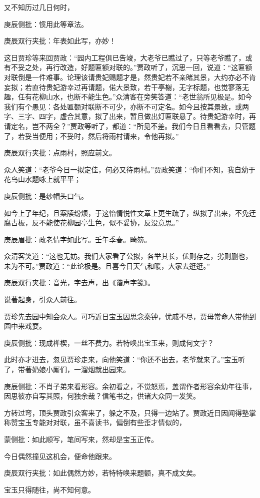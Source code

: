 \begin{parag}


    又不知历过几日何时，\begin{note}庚辰侧批：惯用此等章法。\end{note}\begin{note}庚辰双行夹批：年表如此写，亦妙！\end{note}这日贾珍等来回贾政：“园内工程俱已告竣，大老爷已瞧过了，只等老爷瞧了，或有不妥之处，再行改造，好题匾额对联的。”贾政听了，沉思一回，说道：“这匾额对联倒是一件难事。论理该请贵妃赐题才是，然贵妃若不亲睹其景，大约亦必不肯妄拟；若直待贵妃游幸过再请题，偌大景致，若干亭榭，无字标题，也觉寥落无趣，任有花柳山水，也断不能生色。”众清客在旁笑答道：“老世翁所见极是。如今我们有个愚见：各处匾额对联断不可少，亦断不可定名。如今且按其景致，或两字、三字、四字，虚合其意，拟了出来，暂且做出灯匾联悬了。待贵妃游幸时，再请定名，岂不两全？”贾政等听了，都道：“所见不差。我们今日且看看去，只管题了，若妥当便用；不妥时，然后将雨村请来，令他再拟。”\begin{note}庚辰双行夹批：点雨村，照应前文。\end{note}众人笑道：“老爷今日一拟定佳，何必又待雨村。”贾政笑道：“你们不知，我自幼于花鸟山水题咏上就平平；\begin{note}庚辰侧批：是纱帽头口气。\end{note}如今上了年纪，且案牍纷烦，于这怡情悦性文章上更生疏了，纵拟了出来，不免迂腐古板，反不能使花柳园亭生色，似不妥协，反没意思。”\begin{note}庚辰眉批：政老情字如此写。壬午季春。畸笏。\end{note}众清客笑道：“这也无妨。我们大家看了公拟，各举其长，优则存之，劣则删也，未为不可。”贾政道：“此论极是。且喜今日天气和暖，大家去逛逛。”\begin{note}庚辰双行夹批：音光，字去声，出《谐声字笺》。\end{note}说著起身，引众人前往。
\end{parag}


\begin{parag}


    贾珍先去园中知会众人。可巧近日宝玉因思念秦钟，忧戚不尽，贾母常命人带他到园中来戏耍。\begin{note}庚辰侧批：现成榫楔，一丝不费力。若特唤出宝玉来，则成何文字？\end{note}此时亦才进去，忽见贾珍走来，向他笑道：“你还不出去，老爷就来了。”宝玉听了，带著奶娘小厮们，一溜烟就出园来。\begin{note}庚辰侧批：不肖子弟来看形容。余初看之，不觉怒焉，盖谓作者形容余幼年往事，因思彼亦自写其照，何独余哉？信笔书之，供诸大众同一发笑。\end{note}方转过弯，顶头贾政引众客来了，躲之不及，只得一边站了。贾政近日因闻得塾掌称赞宝玉专能对对联，虽不喜读书，偏倒有些歪才情似的，\begin{note}蒙侧批：如此顺写，笔间写来，然却是宝玉正传。\end{note}今日偶然撞见这机会，便命他跟来。\begin{note}庚辰双行夹批：如此偶然方妙，若特特唤来题额，真不成文矣。\end{note}宝玉只得随往，尚不知何意。
\end{parag}


